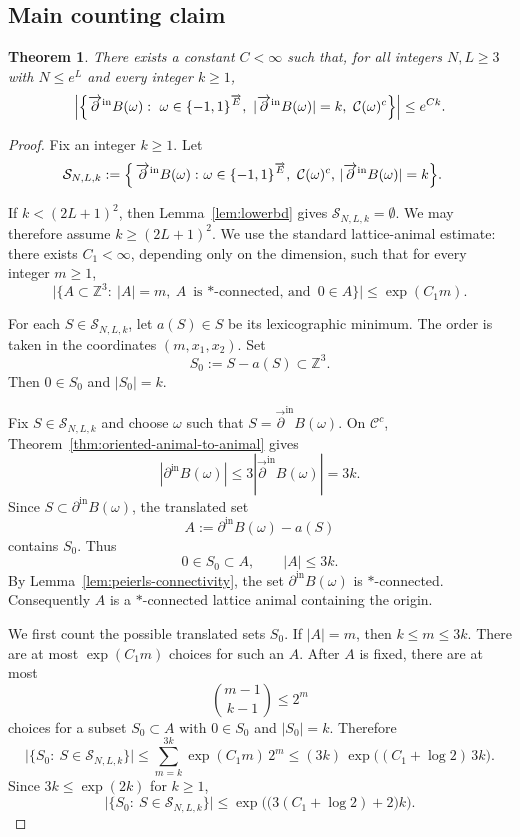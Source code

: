 \documentclass[11pt]{amsart}
\newtheorem{theorem}{Theorem}[section]
\theoremstyle{definition}
\numberwithin{equation}{section}
\newcommand{\Zbb}{\mathbb{Z}}
\newcommand{\mrm}[1]{\mathrm{#1}}
\newcommand{\1}{\mathbbm{1}}
\newcommand{\arrow}[1]{\overrightarrow{#1}}
\newcommand{\arpartial}{\arrow{\partial}}
\begin{document}
\subsection{Main counting claim}
\begin{theorem}\label{thm:count-boundaries}
There exists a constant $C<\infty$ such that, for all integers $N,L\ge 3$
with $N\le e^L$ and every integer $k\ge 1$,
\[
\Bigl|\Bigl\{\arpartial^{\mrm{in}} B(\omega):\ \omega\in\{-1,1\}^{\arrow{E}},\ |\arpartial^{\mrm{in}} B(\omega)|=k,\ \mathcal C(\omega)^c\Bigr\}\Bigr|
\le e^{Ck}.
\]
\end{theorem}
\begin{proof}
Fix an integer $k\ge 1$.  Let
\[
\begin{aligned}
\mathcal S_{N,L,k}:=\Bigl\{\,\arpartial^{\mrm{in}} B(\omega):\ &
\omega\in\{-1,1\}^{\arrow{E}},\ \mathcal C(\omega)^c,\,|\arpartial^{\mrm{in}} B(\omega)|=k
\Bigr\}.
\end{aligned}
\]

If $k<(2L+1)^2$, then Lemma~\ref{lem:lowerbd} gives
$\mathcal S_{N,L,k}=\emptyset$. We may therefore assume
\(
k\ge (2L+1)^2.
\) 
 We use the standard lattice-animal estimate: there exists $C_1<\infty$,
depending only on the dimension, such that for every integer $m\ge 1$,
\[
\bigl|\{A\subset\Zbb^3:\ |A|=m,\ A \text{ is $*$-connected, and }0\in A\}\bigr|
\le \exp(C_1 m).
\]

For each $S\in \mathcal S_{N,L,k}$, let $a(S)\in S$ be its lexicographic minimum.
The order is taken in the coordinates $(m,x_1,x_2)$. Set
\[
S_0:=S-a(S)\subset \Zbb^3.
\]
Then $0\in S_0$ and $|S_0|=k$.

Fix $S\in \mathcal S_{N,L,k}$ and choose $\omega$ such that $S=\arpartial^{\mrm{in}} B(\omega)$.
On $\mathcal C^c$, Theorem~\ref{thm:oriented-animal-to-animal} gives
\[
|\partial^{\mrm{in}} B(\omega)|\le 3|\arpartial^{\mrm{in}} B(\omega)|=3k.
\]
Since $S\subset \partial^{\mrm{in}} B(\omega)$, the translated set
\[
A:=\partial^{\mrm{in}} B(\omega)-a(S)
\]
contains $S_0$. Thus
\[
0\in S_0\subset A,\qquad |A|\le 3k.
\]
By Lemma~\ref{lem:peierls-connectivity}, the set
$\partial^{\mrm{in}} B(\omega)$ is $*$-connected. Consequently $A$ is a
$*$-connected lattice animal containing the origin.

We first count the possible translated sets $S_0$. If $|A|=m$, then
$k\le m\le 3k$. There are at most $\exp(C_1 m)$ choices for such an $A$.
After $A$ is fixed, there are at most
\[
\binom{m-1}{k-1}\le 2^m
\]
choices for a subset $S_0\subset A$ with $0\in S_0$ and $|S_0|=k$.
Therefore
\[
\bigl|\{S_0:\ S\in \mathcal S_{N,L,k}\}\bigr|
\le \sum_{m=k}^{3k} \exp(C_1 m)\,2^m
\le (3k)\,\exp\bigl((C_1+\log 2)\,3k\bigr).
\]
Since $3k\le \exp(2k)$ for $k\ge 1$,
\[
\bigl|\{S_0:\ S\in \mathcal S_{N,L,k}\}\bigr|
\le \exp\bigl(\bigl(3(C_1+\log 2)+2\bigr)k\bigr).
\]


\end{proof}
\end{document}
